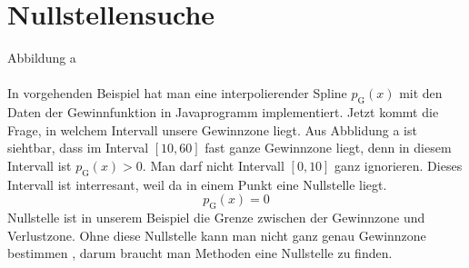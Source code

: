 \section{Nullstellensuche}
Abbildung a
\\
\\
In vorgehenden Beispiel hat man eine interpolierender Spline  $p_\textrm{G}(x)$ mit den Daten der Gewinnfunktion in Javaprogramm implementiert.
 Jetzt kommt die Frage, in welchem Intervall unsere Gewinnzone liegt. Aus Abblidung a ist siehtbar, dass im Interval $[10,60]$ fast ganze Gewinnzone liegt, denn in diesem Intervall ist  $p_\textrm{G}(x) > 0$.
Man darf nicht  Intervall $[0,10]$ ganz ignorieren. Dieses Intervall ist interresant, weil da in einem Punkt eine Nullstelle liegt.
$$p_\textrm{G}(x) =0$$
Nullstelle ist in unserem Beispiel die Grenze zwischen der Gewinnzone und Verlustzone. Ohne diese Nullstelle kann man nicht ganz genau Gewinnzone bestimmen , darum braucht man Methoden eine Nullstelle zu finden.